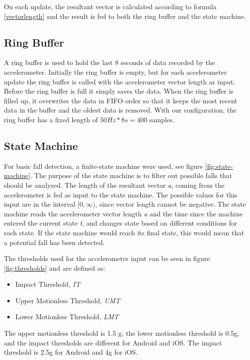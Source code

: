\documentclass[12pt, a4paper, onecolumn]{article}
\begin{document}
	On each update, the resultant vector is calculated according to formula \ref{vectorlength} and the result is fed to both the ring buffer and the state machine.
	
	\subsection{Ring Buffer}
	
	A ring buffer is used to hold the last 8 seconds of data recorded by the accelerometer. Initially the ring buffer is empty, but for each accelerometer update the ring buffer is called with the accelerometer vector length as input. Before the ring buffer is full it simply saves the data. When the ring buffer is filled up, it overwrites the data in FIFO order so that it keeps the most recent data in the buffer and the oldest data is removed. With our configuration, the ring buffer has a fixed length of \(50 Hz * 8s = 400\) samples.
	
	\subsection{State Machine} \label{section:state-machine}
	
	For basic fall detection, a finite-state machine were used, see figure \ref{fig:state-machine}. The purpose of the state machine is to filter out possible falls that should be analyzed. The length of the resultant vector \textit{a}, coming from the accelerometer is fed as input to the state machine. The possible values for this input are in the interval \( [0, \infty) \), since vector length cannot be negative. The state machine reads the accelerometer vector length \textit{a} and the time since the machine entered the current state \textit{t}, and changes state based on different conditions for each state. If the state machine would reach its final state, this would mean that a potential fall has been detected.
	
	The thresholds used for the accelerometer input can be seen in figure \ref{fig:thresholds} and are defined as:
	
	\begin{itemize}
		\item Impact Threshold, \textit{IT}
		\item Upper Motionless Threshold, \textit{UMT}
		\item Lower Motionless Threshold, \textit{LMT}
	\end{itemize}
	
	The upper motionless threshold is 1.5 g, the lower motionless threshold is 0.5g, and the impact thresholds are different for Android and iOS. The impact threshold is 2.5g for Android and 4g for iOS.
	
\end{document}
